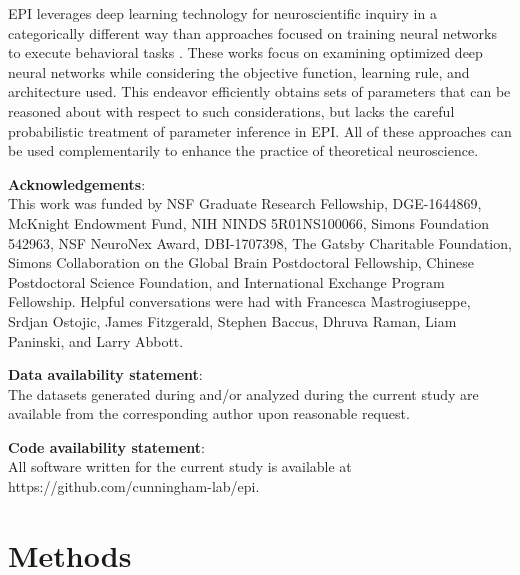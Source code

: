 \documentclass[11pt]{article}
\begin{document}
EPI leverages deep learning technology for neuroscientific inquiry in a categorically different way than approaches focused on training neural networks to execute behavioral tasks \cite{richards2019deep}. 
These works focus on examining optimized deep neural networks while considering the objective function, learning rule, and architecture used.
This endeavor efficiently obtains sets of parameters that can be reasoned about with respect to such considerations, but lacks the careful probabilistic treatment of parameter inference in EPI.
All of these approaches can be used complementarily to enhance the practice of theoretical neuroscience.


\textbf{Acknowledgements}: \\
This work was funded by NSF Graduate Research Fellowship,  DGE-1644869, McKnight Endowment Fund, NIH NINDS 5R01NS100066, Simons Foundation 542963, NSF NeuroNex Award, DBI-1707398, The Gatsby Charitable Foundation, Simons Collaboration on the Global Brain Postdoctoral Fellowship, Chinese Postdoctoral Science Foundation, and International Exchange Program Fellowship. 
Helpful conversations were had with Francesca Mastrogiuseppe, Srdjan Ostojic, James Fitzgerald, Stephen Baccus, Dhruva Raman, Liam Paninski, and Larry Abbott.

\textbf{Data availability statement}: \\
The datasets generated during and/or analyzed during the current study are available from the corresponding author upon reasonable request.

\textbf{Code availability statement}: \\
All software written for the current study is available at https://github.com/cunningham-lab/epi.




\newpage 

\section{Methods}
\end{document}

